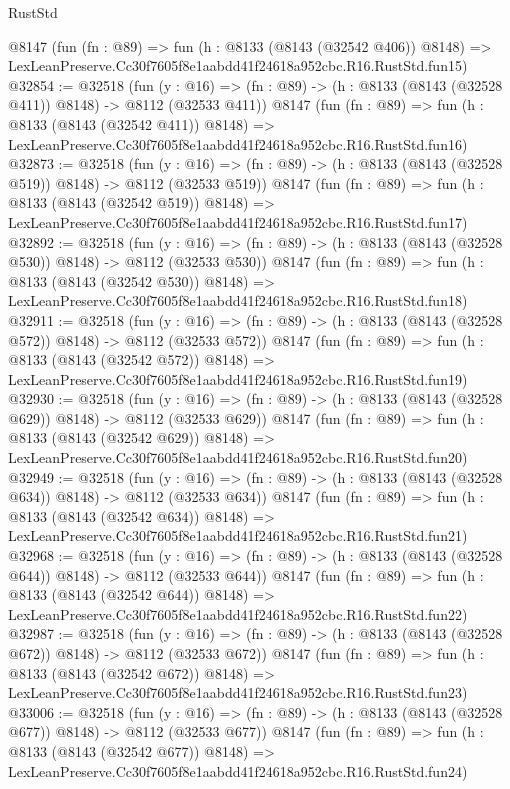 \begin{lexlean}{RustStd}
\begin{coremodule}
    @8147
    (fun (fn : @89) =>
    fun (h : @8133 (@8143 (@32542 @406)) @8148) =>
    LexLeanPreserve.Cc30f7605f8e1aabdd41f24618a952cbc.R16.RustStd.fun15)
@32854 := @32518
    (fun (y : @16) => (fn : @89) -> (h : @8133 (@8143 (@32528 @411)) @8148) -> @8112 (@32533 @411))
    @8147
    (fun (fn : @89) =>
    fun (h : @8133 (@8143 (@32542 @411)) @8148) =>
    LexLeanPreserve.Cc30f7605f8e1aabdd41f24618a952cbc.R16.RustStd.fun16)
@32873 := @32518
    (fun (y : @16) => (fn : @89) -> (h : @8133 (@8143 (@32528 @519)) @8148) -> @8112 (@32533 @519))
    @8147
    (fun (fn : @89) =>
    fun (h : @8133 (@8143 (@32542 @519)) @8148) =>
    LexLeanPreserve.Cc30f7605f8e1aabdd41f24618a952cbc.R16.RustStd.fun17)
@32892 := @32518
    (fun (y : @16) => (fn : @89) -> (h : @8133 (@8143 (@32528 @530)) @8148) -> @8112 (@32533 @530))
    @8147
    (fun (fn : @89) =>
    fun (h : @8133 (@8143 (@32542 @530)) @8148) =>
    LexLeanPreserve.Cc30f7605f8e1aabdd41f24618a952cbc.R16.RustStd.fun18)
@32911 := @32518
    (fun (y : @16) => (fn : @89) -> (h : @8133 (@8143 (@32528 @572)) @8148) -> @8112 (@32533 @572))
    @8147
    (fun (fn : @89) =>
    fun (h : @8133 (@8143 (@32542 @572)) @8148) =>
    LexLeanPreserve.Cc30f7605f8e1aabdd41f24618a952cbc.R16.RustStd.fun19)
@32930 := @32518
    (fun (y : @16) => (fn : @89) -> (h : @8133 (@8143 (@32528 @629)) @8148) -> @8112 (@32533 @629))
    @8147
    (fun (fn : @89) =>
    fun (h : @8133 (@8143 (@32542 @629)) @8148) =>
    LexLeanPreserve.Cc30f7605f8e1aabdd41f24618a952cbc.R16.RustStd.fun20)
@32949 := @32518
    (fun (y : @16) => (fn : @89) -> (h : @8133 (@8143 (@32528 @634)) @8148) -> @8112 (@32533 @634))
    @8147
    (fun (fn : @89) =>
    fun (h : @8133 (@8143 (@32542 @634)) @8148) =>
    LexLeanPreserve.Cc30f7605f8e1aabdd41f24618a952cbc.R16.RustStd.fun21)
@32968 := @32518
    (fun (y : @16) => (fn : @89) -> (h : @8133 (@8143 (@32528 @644)) @8148) -> @8112 (@32533 @644))
    @8147
    (fun (fn : @89) =>
    fun (h : @8133 (@8143 (@32542 @644)) @8148) =>
    LexLeanPreserve.Cc30f7605f8e1aabdd41f24618a952cbc.R16.RustStd.fun22)
@32987 := @32518
    (fun (y : @16) => (fn : @89) -> (h : @8133 (@8143 (@32528 @672)) @8148) -> @8112 (@32533 @672))
    @8147
    (fun (fn : @89) =>
    fun (h : @8133 (@8143 (@32542 @672)) @8148) =>
    LexLeanPreserve.Cc30f7605f8e1aabdd41f24618a952cbc.R16.RustStd.fun23)
@33006 := @32518
    (fun (y : @16) => (fn : @89) -> (h : @8133 (@8143 (@32528 @677)) @8148) -> @8112 (@32533 @677))
    @8147
    (fun (fn : @89) =>
    fun (h : @8133 (@8143 (@32542 @677)) @8148) =>
    LexLeanPreserve.Cc30f7605f8e1aabdd41f24618a952cbc.R16.RustStd.fun24)

\end{coremodule}
\end{lexlean}

